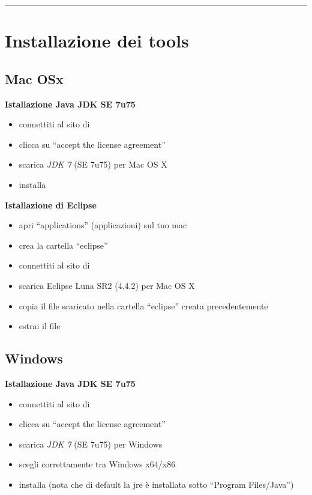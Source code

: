 \documentclass{article}
\begin{document}
\hrule
\section{Installazione dei tools}
\subsection{Mac OSx}
\textbf{Istallazione Java JDK SE 7u75}
\begin{itemize}
\item connettiti al sito di
  \href{http://www.oracle.com/technetwork/java/javase/downloads/jdk7-downloads-1880260.html}{}
\item clicca su ``accept the license agreement''
\item scarica \textit{JDK 7} (SE 7u75) per Mac OS X
\item installa
\end{itemize}

\textbf{Istallazione di Eclipse}
\begin{itemize}
\item apri ``applications'' (applicazioni) sul tuo mac
\item crea la cartella ``eclipse''
\item connettiti al sito di \href{https://eclipse.org/downloads/}{}
\item scarica Eclipse Luna SR2 (4.4.2) per Mac OS X
\item copia il file scaricato nella cartella ``eclipse'' creata precedentemente
\item estrai il file
\end{itemize}


\subsection{Windows}
\textbf{Istallazione Java JDK SE 7u75}
\begin{itemize}
\item connettiti al sito di
  \href{http://www.oracle.com/technetwork/java/javase/downloads/jdk7-downloads-1880260.html}{}
\item clicca su ``accept the license agreement''
\item scarica \textit{JDK 7} (SE 7u75) per Windows
\item scegli correttamente tra Windows x64/x86
\item installa (nota che di default la jre \`e installata sotto ``Program Files/Java'')
\end{itemize}
\end{document}
